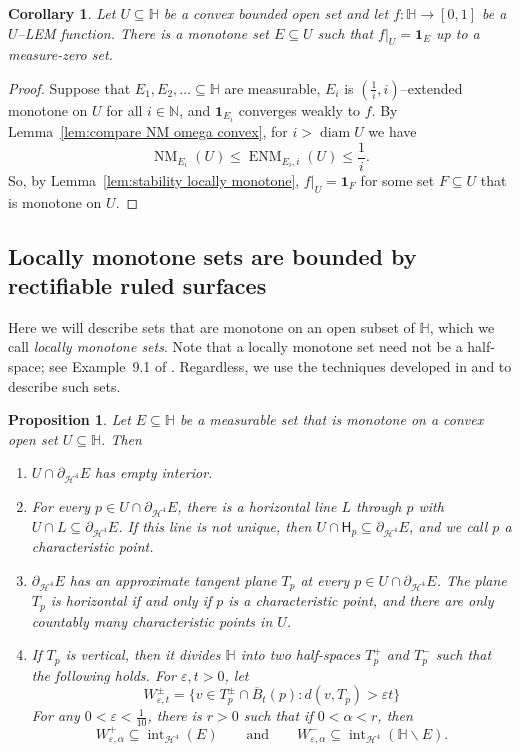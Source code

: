 \documentclass[11pt,reqno]{amsart}
\renewcommand{\H}{\mathbb{H}}
\newcommand{\N}{\mathbb{N}}
\newcommand{\cH}{\mathcal{H}}
\renewcommand{\epsilon}{\varepsilon}
\newcommand{\0}{\mathbf{0}}
\renewcommand{\1}{\mathbf 1}
\newcommand{\one}{\mathbf{1}}
\newcommand{\from}{\colon}
\renewcommand{\mid}{:}
\renewcommand{\subset}{\subseteq}
\renewcommand{\le}{\leqslant}
\renewcommand{\setminus}{\smallsetminus}
\newtheorem{prop}[thm]{Proposition}
\newtheorem{cor}[thm]{Corollary}
\theoremstyle{remark}
\DeclareMathOperator{\NM}{NM}
\DeclareMathOperator{\ENM}{ENM}
\DeclareMathOperator{\diam}{diam}
\DeclareMathOperator{\inter}{int}
\begin{document}
\begin{cor}\label{cor:limits of monotone}
  Let $U\subset \H$ be a convex bounded open set and let $f\from \H\to [0,1]$ be a $U$--LEM function.  There is a monotone set $E\subset U$ such that $f|_U=\one_E$ up to a measure-zero set.
\end{cor}
\begin{proof}
  Suppose that $E_1,E_2,\dots\subset \H$ are measurable, $E_i$ is $(\frac{1}{i},i)$--extended monotone on $U$ for all $i\in \N$, and $\one_{E_i}$ converges weakly to $f$.  By Lemma~\ref{lem:compare NM omega convex}, for $i>\diam U$ we have
  $$\NM_{E_i}(U)\le \ENM_{E_i,i}(U) \le \frac{1}{i}.$$
  So, by Lemma~\ref{lem:stability locally monotone}, $f|_U=\one_F$ for some set $F\subset U$ that is monotone on $U$.
\end{proof}

\subsection{Locally monotone sets are bounded by rectifiable ruled surfaces}\label{sec:rectifiable ruled}

Here we will describe sets that are monotone on an open subset of $\H$, which we call \emph{locally monotone sets}.  Note that a locally monotone set need not be a half-space; see Example~9.1 of \cite{CKN}.  Regardless, we use the techniques developed in \cite{CheegerKleinerMetricDiff} and \cite{CKN} to describe such sets.

\begin{prop}\label{prop:local monotone rectifiability}
  Let $E\subset \H$ be a measurable set that is monotone on a convex open set $U\subset \H$.  Then
  \begin{enumerate}
  \item
    $U\cap \partial_{\cH^4} E$ has empty interior.
  \item
    For every $p\in U\cap \partial_{\cH^4} E$, there is a horizontal line $L$ through $p$ with $U\cap L\subset \partial_{\cH^4} E$.  If this line is not unique, then $U\cap \mathsf{H}_p\subset \partial_{\cH^4} E$, and we call $p$ a \emph{characteristic point}.
  \item $\partial_{\cH^4} E$ has an approximate tangent plane $T_p$ at every $p\in U\cap \partial_{\cH^4} E$.  The plane $T_p$ is horizontal if and only if $p$ is a characteristic point, and there are only countably many characteristic points in $U$.
  \item
    If $T_p$ is vertical, then it divides $\H$ into two half-spaces $T_p^+$ and $T_p^-$ such that the following holds.  For $\epsilon, t>0$, let
    $$W_{\epsilon,t}^\pm=\{v\in T_p^\pm \cap \overline{B}_t(p) \mid d(v,T_p)>\epsilon t\}$$
    For any $0<\epsilon<\frac{1}{10}$, there is $r>0$ such that if $0<\alpha<r$, then
    $$
    W_{\epsilon,\alpha}^+ \subset \inter_{\cH^4} (E)\qquad\mathrm{and}\qquad  W_{\epsilon,\alpha}^- \subset \inter_{\cH^4} (\H\setminus E).$$
  \end{enumerate}
\end{prop}
\end{document}
